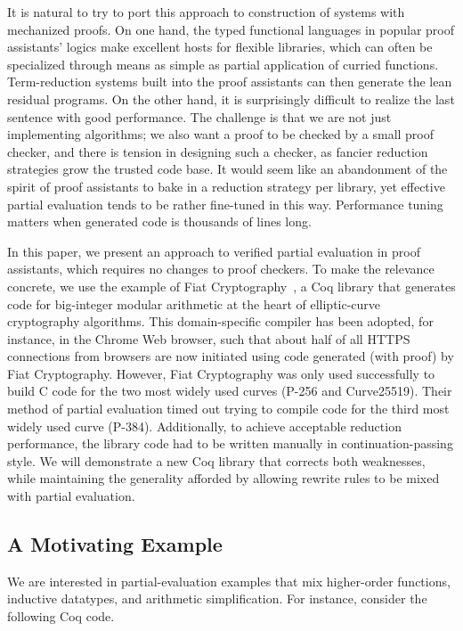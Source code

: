 It is natural to try to port this approach to construction of systems with mechanized proofs.
On one hand, the typed functional languages in popular proof assistants' logics make excellent hosts for flexible libraries, which can often be specialized through means as simple as partial application of curried functions.
Term-reduction systems built into the proof assistants can then generate the lean residual programs.
On the other hand, it is surprisingly difficult to realize the last sentence with good performance.
The challenge is that we are not just implementing algorithms; we also want a proof to be checked by a small proof checker, and there is tension in designing such a checker, as fancier reduction strategies grow the trusted code base.
It would seem like an abandonment of the spirit of proof assistants to bake in a reduction strategy per library, yet effective partial evaluation tends to be rather fine-tuned in this way.
Performance tuning matters when generated code is thousands of lines long.

In this paper, we present an approach to verified partial evaluation in proof assistants, which requires no changes to proof checkers.
To make the relevance concrete, we use the example of Fiat Cryptography~\cite{FiatCryptoSP19}, a Coq library that generates code for big-integer modular arithmetic at the heart of elliptic-curve cryptography algorithms.
This domain-specific compiler has been adopted, for instance, in the Chrome Web browser, such that about half of all HTTPS connections from browsers are now initiated using code generated (with proof) by Fiat Cryptography.
However, Fiat Cryptography was only used successfully to build C code for the two most widely used curves (P-256 and Curve25519).
Their method of partial evaluation timed out trying to compile code for the third most widely used curve (P-384).
Additionally, to achieve acceptable reduction performance, the library code had to be written manually in continuation-passing style.
We will demonstrate a new Coq library that corrects both weaknesses, while maintaining the generality afforded by allowing rewrite rules to be mixed with partial evaluation.

\subsection{A Motivating Example} \label{sec:motivating-example} \label{sec:explain-ident.eagerly} \label{sec:explain-eval-rect} \label{sec:explain-'}

We are interested in partial-evaluation examples that mix higher-order functions, inductive datatypes, and arithmetic simplification.
For instance, consider the following Coq code.

